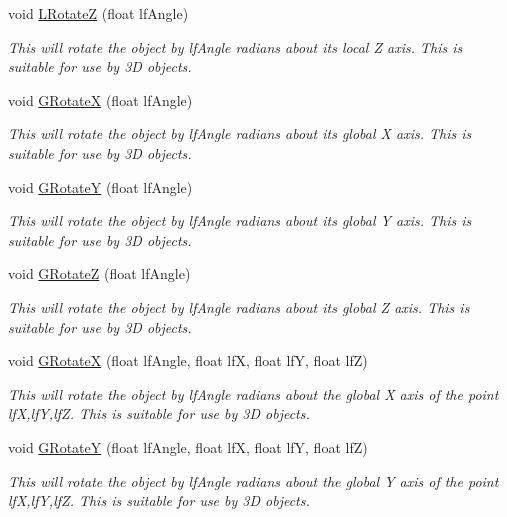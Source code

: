 \begin{DoxyCompactItemize}
void \hyperlink{classc_camera_matrix4_ad4574f0b96ef29472ca6a286f4d8204d}{LRotateZ} (float lfAngle)
\begin{DoxyCompactList}\small\item\em This will rotate the object by lfAngle radians about its local Z axis. This is suitable for use by 3D objects. \item\end{DoxyCompactList}\item 
void \hyperlink{classc_camera_matrix4_a09c8d44629bf63643c8f09ccdc2294bc}{GRotateX} (float lfAngle)
\begin{DoxyCompactList}\small\item\em This will rotate the object by lfAngle radians about its global X axis. This is suitable for use by 3D objects. \item\end{DoxyCompactList}\item 
void \hyperlink{classc_camera_matrix4_a48eb5374c0e7fa4eca25f48a6411052d}{GRotateY} (float lfAngle)
\begin{DoxyCompactList}\small\item\em This will rotate the object by lfAngle radians about its global Y axis. This is suitable for use by 3D objects. \item\end{DoxyCompactList}\item 
void \hyperlink{classc_camera_matrix4_a993d7410719b1fd7d871f728527a3947}{GRotateZ} (float lfAngle)
\begin{DoxyCompactList}\small\item\em This will rotate the object by lfAngle radians about its global Z axis. This is suitable for use by 3D objects. \item\end{DoxyCompactList}\item 
void \hyperlink{classc_camera_matrix4_a2fc16f6a7aa3ffec1317f71645aa857b}{GRotateX} (float lfAngle, float lfX, float lfY, float lfZ)
\begin{DoxyCompactList}\small\item\em This will rotate the object by lfAngle radians about the global X axis of the point lfX,lfY,lfZ. This is suitable for use by 3D objects. \item\end{DoxyCompactList}\item 
void \hyperlink{classc_camera_matrix4_a775326e51bf492340e8768d219a4e5e2}{GRotateY} (float lfAngle, float lfX, float lfY, float lfZ)
\begin{DoxyCompactList}\small\item\em This will rotate the object by lfAngle radians about the global Y axis of the point lfX,lfY,lfZ. This is suitable for use by 3D objects. \item\end{DoxyCompactList}\item 

\end{DoxyCompactItemize}
